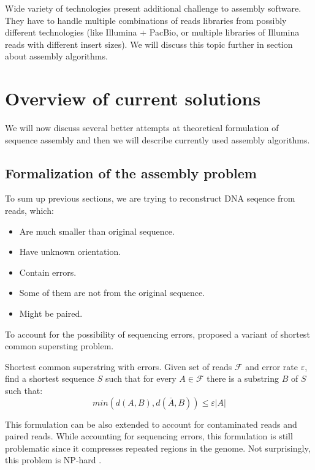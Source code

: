 Wide variety of technologies present additional challenge to assembly software.
They have to handle multiple combinations of reads libraries from possibly
different technologies (like Illumina + PacBio,
or multiple libraries of Illumina reads with different insert sizes).
We will discuss this topic further in section about assembly algorithms. 

\section{Overview of current solutions}

We will now discuss several better attempts at theoretical
formulation of sequence assembly and then we will describe currently
used assembly algorithms.

\subsection{Formalization of the assembly problem}

To sum up previous sections, we are trying to reconstruct DNA seqence from reads,
which:
\begin{itemize}
\itemsep-0pt
\item Are much smaller than original sequence.
\item Have unknown orientation.
\item Contain errors.
\item Some of them are not from the original sequence.
\item Might be paired. 
\end{itemize}

\bigskip

To account for the possibility of sequencing errors, 
\citet{kececioglu1995combinatorial}
proposed a variant of shortest common supersting problem. 

\begin{definition}{Shortest common superstring with errors.}
Given set of reads $\mathcal{F}$ and error rate $\varepsilon$, find
a shortest sequence $S$ such that for every $A \in \mathcal{F}$ there is a substring
$B$ of $S$ such that:
$$min(d(A,B), d(\bar{A}, B)) \leq \varepsilon |A|$$
\end{definition}

This formulation can be also extended to account for contaminated reads and paired reads.
While accounting for sequencing errors, this formulation is still problematic
since it compresses repeated regions in the genome.
Not surprisingly, this problem is NP-hard \citep{kececioglu1991exact}.

